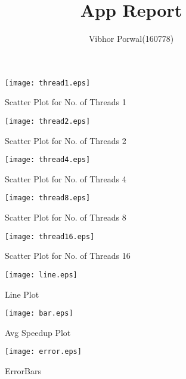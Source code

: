 \documentclass[a4paper, 10pt]{report}
\title{App Report}
\author{Vibhor Porwal(160778)}
\date{}
\begin{document}
\maketitle

\listoffigures

\begin{figure}
\centering
\texttt{[image: thread1.eps]}
\caption{Scatter Plot for No. of Threads 1}
\label{fig:thread1}
\end{figure}

\begin{figure}
\centering
\texttt{[image: thread2.eps]}
\caption{Scatter Plot for No. of Threads 2}
\label{fig:thread2}
\end{figure}

\begin{figure}
\centering
\texttt{[image: thread4.eps]}
\caption{Scatter Plot for No. of Threads 4}
\label{fig:thread4}
\end{figure}

\begin{figure}
\centering
\texttt{[image: thread8.eps]}
\caption{Scatter Plot for No. of Threads 8}
\label{fig:thread8}
\end{figure}

\begin{figure}
\centering
\texttt{[image: thread16.eps]}
\caption{Scatter Plot for No. of Threads 16}
\label{fig:thread16}
\end{figure}


\begin{figure}
\centering
\texttt{[image: line.eps]}
\caption{Line Plot}
\label{fig:line}
\end{figure}

\begin{figure}
\texttt{[image: bar.eps]}
\caption{Avg Speedup Plot}
\label{fig:bar}
\end{figure}


\begin{figure}
\texttt{[image: error.eps]}
\caption{ErrorBars}
\label{fig:errorbar}
\end{figure}
\end{document}
